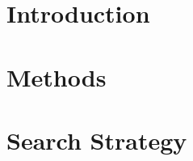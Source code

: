 \documentclass{article}
\begin{document}
\maketitle
\tableofcontents
\clearpage
\section{Introduction} \label{s:intro}      
\section{Methods}      \label{s:methods}    
\clearpage
\printbibliography
\appendix
\clearpage
\section{Search Strategy}\label{a:search}
\end{document}
